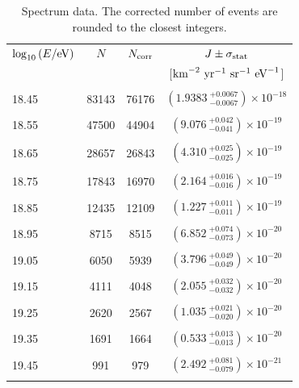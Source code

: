 \begin{table}[h]
\caption{Spectrum data. The corrected number of events are rounded to the closest integers.}
\label{tab:Jdata}
\begin{ruledtabular}
\begin{tabular}{l c c c}
$\mathrm{log}_{10}\left(E/{\rm eV}\right)$ & $N$ & $N_{\rm corr}$ & $J \pm \sigma_{\rm stat}$  \\
   &  & &  [${\rm km}^{-2}~{\rm yr}^{-1}~{\rm sr}^{-1}~{\rm eV}^{-1}$]  \\
\colrule
&&&\\[-0.8em]
18.45 & 83143 &  76176 & $\left( 1.9383 ~^{+0.0067}_{-0.0067} \right) {\times} 10^{-18}$ \\
&&&\\[-0.8em]
18.55 & 47500  &  44904 & $\left( 9.076 ~^{+0.042}_{-0.041} \right) {\times} 10^{-19}$ \\
&&&\\[-0.8em]
18.65 & 28657 &  26843 & $\left( 4.310 ~^{+0.025}_{-0.025} \right) {\times} 10^{-19}$ \\
&&&\\[-0.8em]
18.75 & 17843 &  16970 & $\left( 2.164 ~^{+0.016}_{-0.016} \right) {\times} 10^{-19}$ \\
&&&\\[-0.8em]
18.85 & 12435 &  12109 & $\left( 1.227 ~^{+0.011}_{-0.011} \right) {\times} 10^{-19}$ \\
&&&\\[-0.8em]
18.95 & 8715  &  8515 & $\left( 6.852 ~^{+0.074}_{-0.073} \right) {\times} 10^{-20}$ \\
&&&\\[-0.8em]
19.05 & 6050  &  5939 & $\left( 3.796 ~^{+0.049}_{-0.049} \right) {\times} 10^{-20}$ \\
&&&\\[-0.8em]
19.15 & 4111  &  4048 & $\left( 2.055 ~^{+0.032}_{-0.032} \right) {\times} 10^{-20}$  \\
&&&\\[-0.8em]
19.25 & 2620 &  2567  & $\left( 1.035 ~^{+0.021}_{-0.020} \right) {\times} 10^{-20}$ \\
&&&\\[-0.8em]
19.35 & 1691 &  1664 & $\left( 0.533 ~^{+0.013}_{-0.013} \right) {\times} 10^{-20}$ \\
&&&\\[-0.8em]
19.45 & 991 &  979   & $\left( 2.492 ~^{+0.081}_{-0.079} \right) {\times} 10^{-21}$ \\
&&&\\[-0.8em]

\end{tabular}
\end{ruledtabular}
\end{table}
